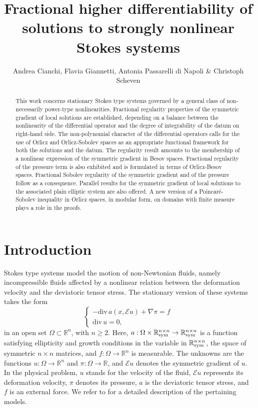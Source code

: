 \documentclass[leqno,11pt]{amsart}%
\title{Fractional higher differentiability of solutions to strongly nonlinear Stokes systems
}
\author {Andrea Cianchi, Flavia Giannetti, Antonia Passarelli di Napoli \& Christoph Scheven}
\numberwithin{equation}{section}
\newcommand{\dive}{\mathrm{div}\,}
\def\real{\mathbb R}
\def\R{\mathbb R}
\def\E{\mathcal{E}}
\def\Sym{\real^{n\times n}_{\textup{sym}}}
\theoremstyle{definition}
\numberwithin{equation}{section}
\begin{document}
\begin{abstract}  { This work concerns   stationary Stokes type systems governed by a general class of non-necessarily power-type nonlinearities. Fractional regularity properties of the symmetric gradient of local solutions are established, depending on a balance between the nonlinearity of the differential operator and the degree of integrability of the datum on right-hand side. The non-polynomial character of the differential operators  calls for the use of Orlicz and Orlicz-Sobolev spaces as an appropriate functional framework for both the solutions and the datum.
The regularity result  amounts to the membership of
a nonlinear expression of the symmetric gradient
in Besov spaces. Fractional regularity of the pressure term is also exhibited and is formulated in terms of Orlicz-Besov spaces. Fractional Sobolev regularity of the symmetric gradient and of the pressure follow as a consequence.}
Parallel results for the symmetric gradient of local solutions to the associated plain  elliptic system are also offered. A new version of a  Poincar\'e-Sobolev inequality in Orlicz spaces, in modular form, on domains with finite measure plays a role in the proofs.
\end{abstract}
\maketitle


\section{Introduction}\label{sec:intro}
 
  Stokes type systems model the motion of  non-Newtonian fluids, namely
incompressible fluids 
affected  by a nonlinear relation between   the deformation velocity and the deviatoric tensor stress. The stationary version of these systems takes the form
\begin{equation}\label{equa}
    \left\{
  \begin{array}{l}
    -\dive a(x,\E u)+\nabla\pi= f\\[0.6ex]
    \dive u=0,
  \end{array}
  \right.
\end{equation}
  in an open  set  $\Omega \subset \R^n$, with $n \geq 2$. Here, $a:\Omega\times\Sym\to\Sym$ is a function satisfying     ellipticity and growth conditions in the variable  
in $\Sym$,  the space of symmetric $n\times n$ matrices, and $f: \Omega \to \R^n$ is  measurable. The unknowns are the functions 
$u: \Omega \to \R^n$ and $\pi : \Omega \to \R$, and $\E u$ denotes the symmetric gradient of $u$. In the physical problem, $u$ stands for the velocity of the fluid, $\E u$ represents its deformation velocity, $\pi$ denotes  its pressure,  $a$ is the deviatoric tensor stress, and $f$ is an external force.  We refer to \cites{AsMar,BAH} for a detailed description of the pertaining models. 
\end{document}
